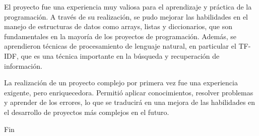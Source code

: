 \documentclass[11pt]{beamer}
\begin{document}
	\begin{frame}
		\justifying
		El proyecto fue una experiencia muy valiosa para el aprendizaje y práctica de la programación. A través de su realización, se pudo mejorar las habilidades en el manejo de estructuras de datos como arrays, listas y diccionarios, que son fundamentales en la mayoría de los proyectos de programación. Además, se aprendieron técnicas de procesamiento de lenguaje natural, en particular el TF-IDF, que es una técnica importante en la búsqueda y recuperación de información.
		
		La realización de un proyecto complejo por primera vez fue una experiencia exigente, pero enriquecedora. Permitió aplicar conocimientos, resolver problemas y aprender de los errores, lo que se traducirá en una mejora de las habilidades en el desarrollo de proyectos más complejos en el futuro.
		
		
	\end{frame}
	
	\newpage
	\vspace*{\fill}
	\begin{center}
		
		\Huge Fin
	\end{center}
	\vspace*{\fill}
	
\end{document}

